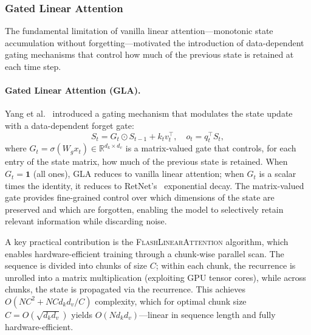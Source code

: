 \subsubsection{Gated Linear Attention}
\label{subsubsec:gated-linear}

The fundamental limitation of vanilla linear attention---monotonic state accumulation without forgetting---motivated the introduction of data-dependent gating mechanisms that control how much of the previous state is retained at each time step.

\paragraph{Gated Linear Attention (GLA).}
Yang et al.~\cite{yang2024gla} introduced a gating mechanism that modulates the state update with a data-dependent forget gate:
\begin{equation}
S_t = G_t \odot S_{t-1} + k_t v_t^\top, \quad o_t = q_t^\top S_t,
\label{eq:gla}
\end{equation}
where $G_t = \sigma(W_g x_t) \in \mathbb{R}^{d_k \times d_v}$ is a matrix-valued gate that controls, for each entry of the state matrix, how much of the previous state is retained. When $G_t = \mathbf{1}$ (all ones), GLA reduces to vanilla linear attention; when $G_t$ is a scalar times the identity, it reduces to RetNet's~\cite{sun2023retentive} exponential decay. The matrix-valued gate provides fine-grained control over which dimensions of the state are preserved and which are forgotten, enabling the model to selectively retain relevant information while discarding noise.

A key practical contribution is the \textsc{FlashLinearAttention} algorithm, which enables hardware-efficient training through a chunk-wise parallel scan. The sequence is divided into chunks of size $C$; within each chunk, the recurrence is unrolled into a matrix multiplication (exploiting GPU tensor cores), while across chunks, the state is propagated via the recurrence. This achieves $O(NC^2 + NC d_k d_v / C)$ complexity, which for optimal chunk size $C = O(\sqrt{d_k d_v})$ yields $O(N d_k d_v)$---linear in sequence length and fully hardware-efficient.

